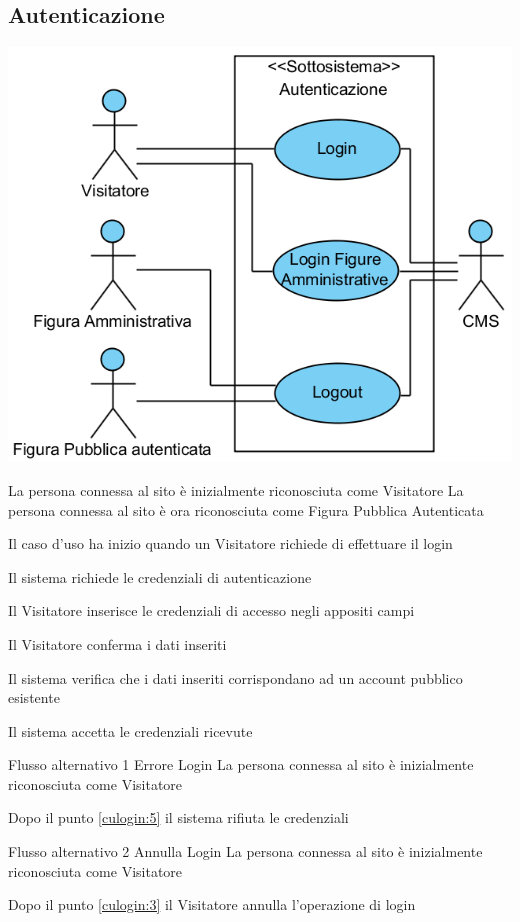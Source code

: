 \subsection{Autenticazione}
\begin{center}
   \includegraphics[width=\textwidth]{assets/visualParadigm/Autenticazione}
\end{center}
%
{}%
{La persona connessa al sito è inizialmente riconosciuta come Visitatore}%
{La persona connessa al sito è ora riconosciuta come Figura Pubblica Autenticata}%
{\begin{enumCU}
	\item Il caso d'uso ha inizio quando un Visitatore richiede di effettuare il login 
	\item Il sistema richiede le credenziali di autenticazione
	\item Il Visitatore inserisce le credenziali di accesso negli appositi campi \label{culogin:3}
	\item Il Visitatore conferma i dati inseriti
	\item Il sistema verifica che i dati inseriti corrispondano ad un account pubblico esistente\label{culogin:5}
	\item Il sistema accetta le credenziali ricevute
\end{enumCU}}%
%
{Flusso alternativo 1}%
{Errore Login}%
{La persona connessa al sito è inizialmente riconosciuta come Visitatore}%
{\postNulle}%
{\begin{enumCU}
	\item Dopo il punto \ref{culogin:5} il sistema rifiuta le credenziali
\end{enumCU}}%
%
{Flusso alternativo 2}%
{Annulla Login}%
{La persona connessa al sito è inizialmente riconosciuta come Visitatore}%
{\postNulle}%
{\begin{enumCU}
		\item Dopo il punto \ref{culogin:3} il Visitatore annulla l'operazione di login
\end{enumCU}}%

